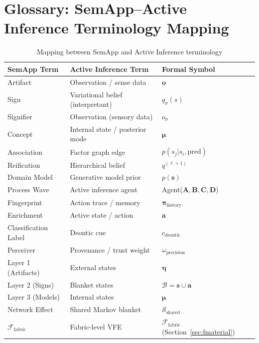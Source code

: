 \documentclass[11pt,a4paper]{article}
\theoremstyle{definition}
\newcommand{\bq}{q}
\newcommand{\bp}{p}
\newcommand{\bo}{\bm{o}}
\newcommand{\bs}{\bm{s}}
\newcommand{\ba}{\bm{a}}
\newcommand{\bpi}{\bm{\pi}}
\newcommand{\bmu}{\bm{\mu}}
\newcommand{\boldeta}{\bm{\eta}}
\begin{document}
\section{Glossary: SemApp--Active Inference Terminology Mapping}
\label{app:glossary}

\begin{table}[H]
\centering
\caption{Mapping between SemApp and Active Inference terminology}
\begin{tabular}{lll}
\toprule
\textbf{SemApp Term} & \textbf{Active Inference Term} & \textbf{Formal Symbol} \\
\midrule
Artifact & Observation / sense data & $\bo$ \\
Sign & Variational belief (interpretant) & $\bq_\sigma(s)$ \\
Signifier & Observation (sensory data) & $o_\sigma$ \\
Concept & Internal state / posterior mode & $\bmu$ \\
Association & Factor graph edge & $\bp(s_j | s_i, \text{pred})$ \\
Reification & Hierarchical belief & $\bq^{(\ell+1)}$ \\
Domain Model & Generative model prior & $\bp(\bs)$ \\
Process Wave & Active inference agent & Agent($\mathbf{A}, \mathbf{B}, \mathbf{C}, \mathbf{D}$) \\
Fingerprint & Action trace / memory & $\bpi_{\text{history}}$ \\
Enrichment & Active state / action & $\ba$ \\
Classification Label & Deontic cue & $c_{\text{deontic}}$ \\
Perceiver & Provenance / trust weight & $\omega_{\text{precision}}$ \\
Layer 1 (Artifacts) & External states & $\boldeta$ \\
Layer 2 (Signs) & Blanket states & $\mathcal{B} = \bs \cup \ba$ \\
Layer 3 (Models) & Internal states & $\bmu$ \\
Network Effect & Shared Markov blanket & $\mathcal{S}_{\text{shared}}$ \\
$\mathcal{F}_{\text{fabric}}$ & Fabric-level VFE & $\mathcal{F}_{\text{fabric}}$ (Section~\ref{sec:fmaterial}) \\
\bottomrule
\end{tabular}
\end{table}
\end{document}

